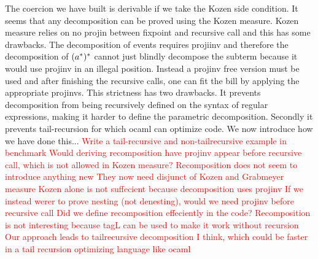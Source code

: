 \documentclass[a4paper,UKenglish,cleveref, autoref, thm-restate]{lipics-v2021}
\newcommand\mycomment[1]{\textcolor{red}{#1}}
\begin{document}
The coercion we have built is derivable if we take the Kozen side condition. It seems that any decomposition can be proved using the Kozen measure. Kozen measure relies on no projin between fixpoint and recursive call and this has some drawbacks. The decomposition of events requires projiinv and therefore the decomposition of $({a^*})^*$ cannot just blindly decompose the subterm because it would use projinv in an illegal position. Instead a projinv free version must be used and after finishing the recursive calls, one can fit the bill by applying the appropriate projinvs. This strictness has two drawbacks. It prevents decomposition from being recursively defined on the syntax of regular expressions, making it harder to define the parametric decomposition. Secondly it prevents tail-recursion for which ocaml can optimize code. We now introduce how we have done this...
\mycomment{Write a tail-recursive and non-tailrecursive example in benchmark}
\mycomment{Would deriving recomposition have projinv appear before recursive call, which is not allowed in Kozen measure? Recomposition does not seem to introduce anything new}
\mycomment{They now need disjunct of Kozen and Grabmeyer measure}
\mycomment{Kozen alone is not suffecient because decomposition uses projinv}
\mycomment{If we instead werer to prove nesting (not denesting), would we need projinv before recursive call}
\mycomment{Did we define recomposition effeciently in the code?}
\mycomment{Recomposition is not interesting because tagL can be used to make it work without recursion}
\mycomment{Our approach leads to tailrecursive decomposition I think, which could be faster in a tail recursion optimizing language like ocaml}
\newpage
\end{document}
